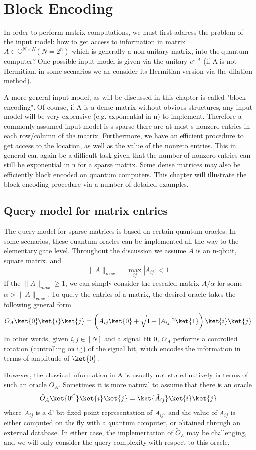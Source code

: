 \documentclass[12pt, oneside]{book}
\theoremstyle{definition}
\theoremstyle{definition}
\theoremstyle{remark}
\begin{document}
\chapter{Block Encoding}
In order to perform matrix computations, we must first address the problem of the input model: how to get access to information in matrix $A\in \mathbb{C}^{N \times N} (N=2^n)$ which is generally a non-unitary matrix, into the quantum computer? One possible input model is given via the unitary $e^{\iota \tau A}$ (if A is not Hermitian, in some scenarios we an consider its Hermitian version via the dilation method).

A more general input model, as will be discussed in this chapter is called "block encoding". Of course, if A is a dense matrix without obvious structures, any input model will be very expensive (e.g. exponential in n) to implement. Therefore a commonly assumed input model is s-sparse there are at most s nonzero entries in each row/column of the matrix. Furthermore, we have an efficient procedure to get access to the location, as well as the value of the nonzero entries. This in general can again be a difficult task given that the number of nonzero entries can still be exponential in n for a sparse matrix. Some dense matrices may also be efficiently block encoded on quantum computers. This chapter will illustrate the block encoding procedure via a number of detailed examples.

\section{Query model for matrix entries}
The query model for sparse matrices is based on certain quantum oracles. In some scenarios, these quantum oracles can be implemented all the way to the elementary gate level. Throughout the discussion we assume $A$ is an n-qbuit, square matrix, and 
\[
\|A\|_{max}=\max_{ij}|A_{ij}|<1
\]
If the $\|A\|_{max}\geq 1$, we can simply consider the rescaled matrix $\tilde{A}/\alpha$ for some $\alpha>\|A\|_{max}$. To query the entries of a matrix, the desired oracle takes the following general form
\[
O_A\ket{0}\ket{i}\ket{j}=\left(A_{ij}\ket{0}+\sqrt{1-|A_{ij}|^2}\ket{1}\right)\ket{i}\ket{j}
\]
In other words, given $i,j\in[N]$ and a signal bit $0$, $O_A$ performs a controlled rotation (controlling on i,j) of the signal bit, which encodes the information in terms of amplitude of $\ket{0}$.

However, the classical information in A is usually not stored natively in terms of such an oracle $O_A$. Sometimes it is more natural to assume that there is an oracle
\[
\tilde{O}_A\ket{0^{d'}}\ket{i}\ket{j}=\ket{\tilde{A}_{ij}}\ket{i}\ket{j}
\]
where $\tilde{A}_{ij}$ is a d'-bit fixed point representation of $A_{ij}$, and the value of $\tilde{A}_{ij}$ is either computed on the fly with a quantum computer, or obtained through an external database. In either case, the implementation of $\tilde{O}_A$ may be challenging, and we will only consider the query complexity with respect to this oracle.
\end{document}
